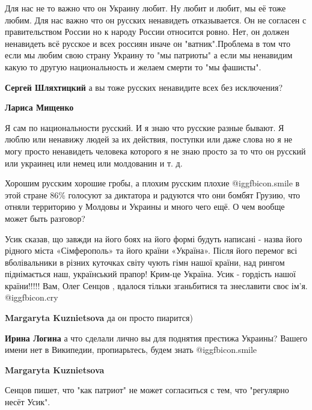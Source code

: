 \begin{itemize}
Для нас не то важно что он Украину любит. Ну любит и любит, мы её тоже любим. Для
нас важно что он русских ненавидеть отказывается. Он не согласен с
правительством России но к народу России относится ровно. Нет, он должен
ненавидеть всё русское и всех россиян иначе он "ватник".Проблема в том что если
мы любим свою страну Украину то "мы патриоты" а если мы ненавидим какую то
другую национальность и желаем смерти то "мы фашисты".

\begin{itemize} %
\textbf{Сергей Шляхтицкий} а вы тоже русских ненавидите всех без исключения?

\textbf{Лариса Мищенко} 

Я сам по национальности русский. И я знаю что русские разные бывают. Я люблю или
ненавижу людей за их действия, поступки или даже слова но я не могу просто
ненавидеть человека которого я не знаю просто за то что он русский или украинец
или немец или молдованин и т. д.


Хорошим русским хорошие гробы, а плохим русским плохие  @igg{fbicon.smile}  в этой стране 86\%
голосуют за диктатора и радуются что они бомбят Грузию, что отняли территорию у
Молдовы и Украины и много чего ещё. О чем вообще может быть разговор?

\end{itemize} %


Усик сказав, що завжди на його боях на його формі будуть написані - назва його
рідного міста «Сімферополь» та його країни «Україна». Після його перемог всі
вболівальники в різних куточках світу чують гімн нашої країни, над рингом
піднімається наш, український прапор! Крим-це Україна. Усик - гордість нашої
країни!!!!! Вам, Олег Сенцов , вдалося тільки зганьбитися та знеславити своє
ім’я.  @igg{fbicon.cry} 

\begin{itemize} %
\textbf{Margaryta Kuznietsova} да он просто пиарится)

\textbf{Ирина Логина} а что сделали лично вы для поднятия престижа Украины? Вашего имени нет в Википедии, пропиарьтесь, будем знать  @igg{fbicon.smile} 

\textbf{Margaryta Kuznietsova} 

Сенцов пишет, что "как патриот" не может согласиться с тем, что "регулярно
несёт Усик".


\end{itemize}
\end{itemize}
